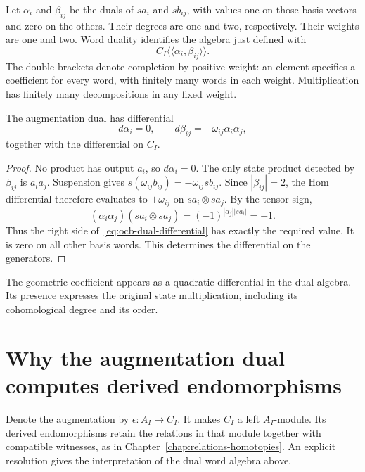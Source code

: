 Let $\alpha_i$ and $\beta_{ij}$ be the duals of $sa_i$ and
$sb_{ij}$, with values one on those basis vectors and zero on the
others. Their degrees are one and two, respectively.
Their weights are one and two.
Word duality identifies the algebra just defined with
\[
 C_I\langle\!\langle\alpha_i,\beta_{ij}\rangle\!\rangle.
\]
The double brackets denote completion by positive weight:
an element specifies a coefficient for every word, with finitely
many words in each weight. Multiplication has finitely many
decompositions in any fixed weight.

\begin{proposition}\label{prop:ocb-dual-differential}
The augmentation dual has differential
\begin{equation}\label{eq:ocb-dual-differential}
 d\alpha_i=0,\qquad
 d\beta_{ij}=-\omega_{ij}\alpha_i\alpha_j,
\end{equation}
together with the differential on $C_I$.
\end{proposition}

\begin{proof}
No product has output $a_i$, so $d\alpha_i=0$.
The only state product detected by $\beta_{ij}$ is $a_i a_j$.
Suspension gives
$s(\omega_{ij}b_{ij})=-\omega_{ij}sb_{ij}$.
Since $|\beta_{ij}|=2$, the Hom differential therefore evaluates
to $+\omega_{ij}$ on $sa_i\otimes sa_j$.
By the tensor sign,
\[
 (\alpha_i\alpha_j)(sa_i\otimes sa_j)
 =(-1)^{|\alpha_j||sa_i|}=-1.
\]
Thus the right side of~\eqref{eq:ocb-dual-differential} has exactly
the required value. It is zero on all other basis words.
This determines the differential on the generators.
\end{proof}

The geometric coefficient appears as a quadratic differential in
the dual algebra. Its presence expresses the original state
multiplication, including its cohomological degree and its order.

\section{Why the augmentation dual computes derived endomorphisms}

Denote the augmentation by $\epsilon:A_I\to C_I$.
It makes $C_I$ a left $A_I$-module.
Its derived endomorphisms retain the relations in that module
together with compatible witnesses, as in
Chapter~\ref{chap:relations-homotopies}.
An explicit resolution gives the interpretation of the dual word
algebra above.


